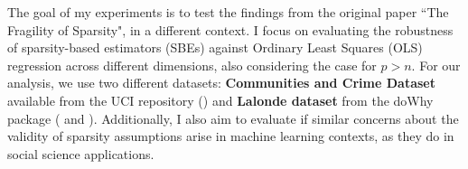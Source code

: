 The goal of my experiments is to test the findings from the original paper ``The Fragility of Sparsity", in a different context. I focus on evaluating the robustness of sparsity-based estimators (SBEs) against Ordinary Least Squares (OLS) regression across different dimensions, also considering the case for $p>n$. For our analysis, we use two different datasets: \textbf{Communities and Crime Dataset} available from the UCI repository (\cite{misc_communities_and_crime_unnormalized_211}) and \textbf{Lalonde dataset} from the doWhy package (\cite{dowhy} and \cite{JMLR:v25:22-1258}). Additionally, I also aim  to evaluate if similar concerns about the validity of sparsity assumptions arise in machine learning contexts, as they do in social science applications.